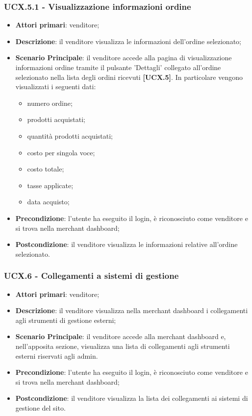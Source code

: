 \subsubsection{UCX.5.1 - Visualizzazione informazioni ordine}
\begin{itemize}
\item \textbf{Attori primari}: venditore;
\item \textbf{Descrizione}: il venditore visualizza le informazioni dell'ordine selezionato;
\item \textbf{Scenario Principale}: il venditore accede alla pagina di visualizzazione informazioni ordine tramite il pulsante 'Dettagli' collegato all'ordine selezionato nella lista degli ordini ricevuti \textbf{[UCX.5]}. In particolare vengono visualizzati i seguenti dati:
\begin{itemize}
	\item numero ordine;
	\item prodotti acquistati;
	\item quantità prodotti acquistati;
	\item costo per singola voce;
	\item costo totale;
	\item tasse applicate;
	\item data acquisto;
\end{itemize}
\item \textbf{Precondizione}: l'utente ha eseguito il login, è riconosciuto come venditore e si trova nella merchant dashboard;
\item \textbf{Postcondizione}: il venditore visualizza le informazioni relative all'ordine selezionato.
\end{itemize}

\subsubsection{UCX.6 - Collegamenti a sistemi di gestione}
\begin{itemize}
\item \textbf{Attori primari}: venditore;
\item \textbf{Descrizione}: il venditore visualizza nella merchant dashboard i collegamenti agli strumenti di gestione esterni;
\item \textbf{Scenario Principale}: il venditore accede alla merchant dashboard e, nell'apposita sezione, visualizza una lista di collegamenti agli strumenti esterni riservati agli admin.
\item \textbf{Precondizione}: l'utente ha eseguito il login, è riconosciuto come venditore e si trova nella merchant dashboard;
\item \textbf{Postcondizione}: il venditore visualizza la lista dei collegamenti ai sistemi di gestione del sito.
\end{itemize}

